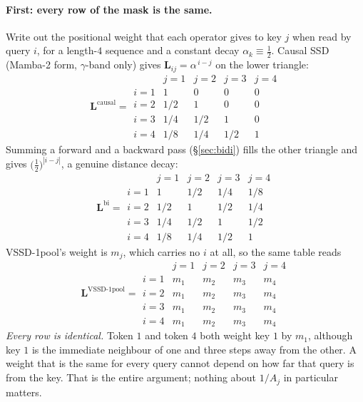 \documentclass[11pt,a4paper]{article}
\begin{document}
\paragraph{First: every row of the mask is the same.}
Write out the positional weight that each operator gives to key $j$ when read
by query $i$, for a length-$4$ sequence and a constant decay
$\alpha_k\equiv\tfrac12$. Causal SSD (Mamba-2 form, $\gamma$-band only) gives
$\bm{L}_{ij}=\alpha^{\,i-j}$ on the lower triangle:
\begin{equation*}
  \bm{L}^{\text{causal}} =
  \begin{array}{c|cccc}
     & j{=}1 & j{=}2 & j{=}3 & j{=}4 \\ \hline
    i{=}1 & 1     & 0     & 0    & 0 \\
    i{=}2 & 1/2   & 1     & 0    & 0 \\
    i{=}3 & 1/4   & 1/2   & 1    & 0 \\
    i{=}4 & 1/8   & 1/4   & 1/2  & 1
  \end{array}
\end{equation*}
Summing a forward and a backward pass (\S\ref{sec:bidi}) fills the other
triangle and gives $\bigl(\tfrac12\bigr)^{|i-j|}$, a genuine distance decay:
\begin{equation*}
  \bm{L}^{\text{bi}} =
  \begin{array}{c|cccc}
     & j{=}1 & j{=}2 & j{=}3 & j{=}4 \\ \hline
    i{=}1 & 1    & 1/2  & 1/4  & 1/8 \\
    i{=}2 & 1/2  & 1    & 1/2  & 1/4 \\
    i{=}3 & 1/4  & 1/2  & 1    & 1/2 \\
    i{=}4 & 1/8  & 1/4  & 1/2  & 1
  \end{array}
\end{equation*}
VSSD-1pool's weight is $m_j$, which carries no $i$ at all, so the same
table reads
\begin{equation*}
  \bm{L}^{\text{VSSD-1pool}} =
  \begin{array}{c|cccc}
     & j{=}1 & j{=}2 & j{=}3 & j{=}4 \\ \hline
    i{=}1 & m_1 & m_2 & m_3 & m_4 \\
    i{=}2 & m_1 & m_2 & m_3 & m_4 \\
    i{=}3 & m_1 & m_2 & m_3 & m_4 \\
    i{=}4 & m_1 & m_2 & m_3 & m_4
  \end{array}
\end{equation*}
\emph{Every row is identical.} Token $1$ and token $4$ both weight key $1$ by
$m_1$, although key $1$ is the immediate neighbour of one and three steps away
from the other. A weight that is the same for every query cannot depend on how
far that query is from the key. That is the entire argument; nothing about
$1/A_j$ in particular matters.
\end{document}
